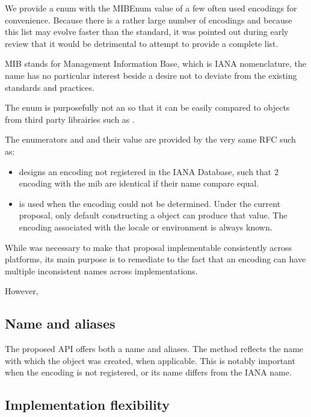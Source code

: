 \documentclass{wg21}
\begin{document}
We provide a  enum with the MIBEnum value of a few often used encodings for convenience.
Because there is a rather large number of encodings and because this list may evolve faster than the standard, it was pointed out during early review that it would be detrimental to attempt to provide a complete list.
\begin{note}
MIB stands for Management Information Base, which is IANA nomenclature, the name has no particular interest beside a desire not to deviate from the existing standards and practices.
\end{note}

The enum is purposefully not an  so that it can be easily compared to objects from
third party librairies such as .

The enumerators  and  and their value are provided by the very same RFC such as:

\begin{itemize}
	\item {} designs an encoding not registered in the IANA Database, such that 2 encoding with the  mib are identical if their name compare equal.
	\item {} is used when the encoding could not be determined. Under the current proposal,  only default constructing a  object can produce that value. The encoding associated with the
	locale or environment is always known.
\end{itemize}

While  was necessary to make that proposal implementable consistently across platforms,
its main purpose is to remediate to the fact that an encoding can have multiple inconsistent names across implementations.

However,

\subsection{Name and aliases}

The proposed API offers both a name and aliases.
The  method reflects the name with which the  object was created, when applicable.
This is notably important when the encoding is not registered, or its name differs from the IANA name.

\subsection{Implementation flexibility}
\end{document}
